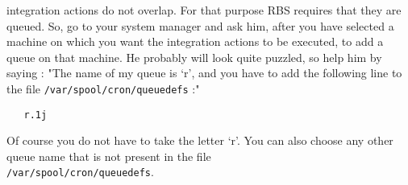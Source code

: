 \begin{enumerate}
   integration actions do not overlap. For that purpose RBS requires that they
   are queued. So, go to your system manager and ask him, after you have
   selected a machine on which you want the integration actions to be
   executed, to add a queue on that machine. He probably will look quite
   puzzled, so help him by saying : "The name of my queue is `r', and you
   have to add the following line to the file 
    \verb+/var/spool/cron/queuedefs+ :"
\begin{verbatim}
   r.1j
\end{verbatim}
   Of course you do not have to take the letter `r'. You can also choose any
   other queue name that is not present in the file\\ 
   \verb+/var/spool/cron/queuedefs+.
\end{enumerate}

